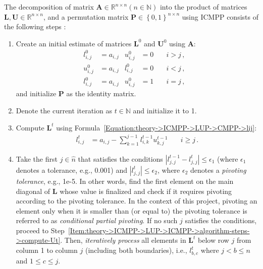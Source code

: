 The decomposition of matrix $\mathbf{A} \in \mathbb{R}^{n \times n} \left(n \in \mathbb{N}\right)$ into the product of matrices $\mathbf{L}, \mathbf{U} \in \mathbb{R}^{n \times n}$, and a permutation matrix $\mathbf{P} \in \left\{0,1\right\}^{n \times n}$ using ICMPP consists of the following steps \cite{Cejka2022}:

\begin{enumerate}
	\item Create an initial estimate of matrices $\mathbf{L}^{0}$ and $\mathbf{U}^{0}$ using $\mathbf{A}$:
		\begin{align}
			l_{i,j}^{0} & = a_{i,j} & u_{i,j}^{0} & = 0 \quad & i > j \nonumber\,, &  \\
			u_{i,j}^{0} & = a_{i,j} & l_{i,j}^{0} & = 0 \quad & i < j \nonumber\,, &  \\
			l_{i,j}^{0} & = a_{i,j} & u_{i,j}^{0} & = 1       & i = j \nonumber\,, &
		\end{align}
		and initialize $\mathbf{P}$ as the identity matrix.
	\item Denote the current iteration as $t \in \mathbb{N}$ and initialize it to 1.
	\item \label{Item:theory->ICMPP->LUP->ICMPP->algorithm-steps->compute-Lt}
		Compute $\mathbf{L}^{t}$ using Formula~\ref{Equation:theory->ICMPP->LUP->CMPP->lij}:
		\begin{align}
			l_{i,j}^{t} &= a_{i,j} - \sum_{k=1}^{j-1}l_{i,k}^{t-1}u_{k,j}^{t-1} &\quad i \geq j \nonumber\,.
		\end{align}
	\item \label{Item:theory->ICMPP->LUP->ICMPP->algorithm-steps->process-lower-sections}
		Take the first $j \in \widehat{n}$ that satisfies the conditions $\left|l^{t-1}_{j, j} - l^{t}_{j, j}\right| \leq \epsilon_1$ (where $\epsilon_1$ denotes a tolerance, e.g., 0.001) and $\left|l^{t}_{j, j}\right| \leq \epsilon_2$, where $\epsilon_2$ denotes a \textit{pivoting tolerance}, e.g., 1e-5.
		In other words, find the first element on the main diagonal of $\mathbf{L}$ whose value is finalized and check if it requires pivoting according to the pivoting tolerance.
		In the context of this project, pivoting an element only when it is smaller than (or equal to) the pivoting tolerance is referred to as \textit{conditional partial pivoting}.
		If no such $j$ satisfies the conditions, proceed to Step~\ref{Item:theory->ICMPP->LUP->ICMPP->algorithm-steps->compute-Ut}.
		Then, \textit{iteratively process} all elements in $\mathbf{L}^{t}$ below row $j$ from column 1 to column $j$ (including both boundaries), i.e., $l^{t}_{b, c}$ where $j < b \leq n$ and $1 \leq c \leq j$.

\end{enumerate}
